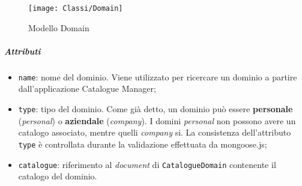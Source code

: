 \begin{figure}[h]
	\begin{center}
  		\texttt{[image: Classi/Domain]}
 		\caption[Modello Domain]{Modello Domain}
 		\label{fig:Domain}
 	\end{center} 
\end{figure}

\subparagraph{Attributi}
\begin{itemize}
\item \texttt{name}: nome del dominio. Viene utilizzato per ricercare un dominio a partire dall'applicazione Catalogue Manager;
\item \texttt{type}: tipo del dominio. Come già detto, un dominio può essere \textbf{personale} (\textit{personal}) o \textbf{aziendale} (\textit{company}). I domini \textit{personal} non possono avere un catalogo associato, mentre quelli \textit{company} si. La consistenza dell'attributo \texttt{type} è controllata durante la validazione effettuata da mongoose.js;
\item \texttt{catalogue}: riferimento al \textit{document} di \texttt{CatalogueDomain} contenente il catalogo del dominio.
\end{itemize}

%
